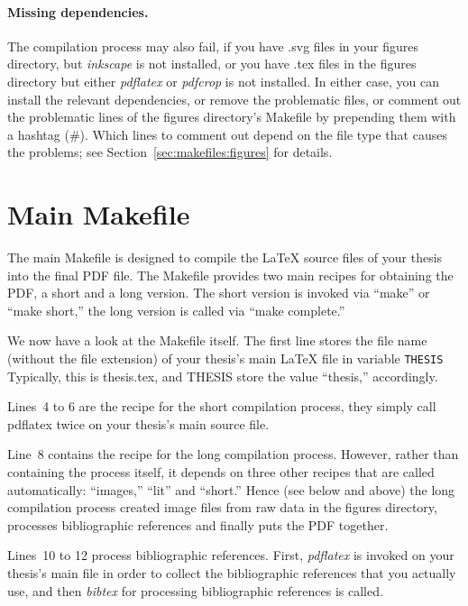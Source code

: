 \paragraph{Missing dependencies.}
The compilation process may also fail, if you have \mbox{.svg} files in your
figures directory, but \emph{inkscape} is not installed, or you have
\mbox{.tex} files in the figures directory but either \emph{pdflatex} or
\emph{pdfcrop} is not installed.
In either case, you can install the relevant dependencies, or remove the
problematic files, or comment out the problematic lines of the figures
directory's Makefile by prepending them with a hashtag (\#).
Which lines to comment out depend on the file type that causes the problems;
see Section~\ref{sec:makefiles:figures} for details.




\section{Main Makefile}
\label{sec:makefiles:main}
The main Makefile is designed to compile the \LaTeX{} source files of your
thesis into the final PDF file.
The Makefile provides two main recipes for obtaining the PDF, a short and a
long version.
The short version is invoked via ``make'' or ``make short,'' the long
version is called via ``make complete.''
 
We now have a look at the Makefile itself.
The first line stores the file name (without the file extension) of your
thesis's main \LaTeX{} file in variable \texttt{THESIS}
Typically, this is \mbox{thesis.tex}, and THESIS store the value ``thesis,''
accordingly.

Lines~4 to 6 are the recipe for the short compilation process, they simply call
pdflatex twice on your thesis's main source file.

Line~8 contains the recipe for the long compilation process. 
However, rather than containing the process itself, it depends on three other
recipes that are called automatically: ``images,'' ``lit'' and ``short.''
Hence (see below and above) the long compilation process created image files
from raw data in the figures directory, processes bibliographic references and
finally puts the PDF together.

Lines~10 to 12 process bibliographic references.
First, \emph{pdflatex} is invoked on your thesis's main file in order to
collect the bibliographic references that you actually use, and then 
\emph{bibtex} for processing bibliographic references is called.

